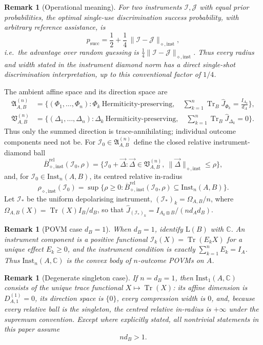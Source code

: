 \documentclass[11pt,a4paper]{article}
\newtheorem{remark}[theorem]{Remark}
\newcommand{\Lin}{\mathrm{L}}
\newcommand{\Inst}{\mathrm{Inst}}
\newcommand{\Tr}{\operatorname{Tr}}
\newcommand{\Jhat}{\widehat J}
\newcommand{\vD}{\vec{\Delta}}
\begin{document}
\begin{remark}[Operational meaning]
\label{rem:operational}
For two instruments $\mathcal I,\mathcal J$ with equal prior probabilities, the optimal single-use discrimination success probability, with arbitrary reference assistance, is
\[
p_{\mathrm{succ}}
=\frac12+\frac14\,\|\mathcal I-\mathcal J\|_{\diamond,\mathrm{inst}},
\]
i.e.\ the advantage over random guessing is $\tfrac14\|\mathcal I-\mathcal J\|_{\diamond,\mathrm{inst}}$. Thus every radius and width stated in the instrument diamond norm has a direct single-shot discrimination interpretation, up to this conventional factor of $1/4$.
\end{remark}

The ambient affine space and its direction space are
\begin{align*}
\mathfrak A_{A,B}^{(n)}
&=\Big\{(\Phi_1,\dots,\Phi_n):
\Phi_k\ \text{Hermiticity-preserving},\quad
\sum_{k=1}^n\Tr_B\Jhat_{\Phi_k}=\frac{I_{A_0}}{d_A}\Big\},\\
\mathfrak V_{A,B}^{(n)}
&=\Big\{(\Delta_1,\dots,\Delta_n):
\Delta_k\ \text{Hermiticity-preserving},\quad
\sum_{k=1}^n\Tr_B\Jhat_{\Delta_k}=0\Big\}.
\end{align*}
Thus only the summed direction is trace-annihilating; individual outcome components need not be. For $\mathcal I_0\in\mathfrak A_{A,B}^{(n)}$ define the closed relative instrument-diamond ball
\[
\overline B_{\diamond,\mathrm{inst}}^{\mathrm{rel}}(\mathcal I_0,\rho)
=\big\{\mathcal I_0+\vD:\vD\in\mathfrak V_{A,B}^{(n)},\ \|\vD\|_{\diamond,\mathrm{inst}}\le\rho\big\},
\]
and, for $\mathcal I_0\in\Inst_n(A,B)$, its centred relative in-radius
\[
\rho_{\diamond,\mathrm{inst}}(\mathcal I_0)
=\sup\Big\{\rho\ge0:
\overline B_{\diamond,\mathrm{inst}}^{\mathrm{rel}}(\mathcal I_0,\rho)
\subseteq\Inst_n(A,B)\Big\}.
\]
Let $\mathcal I_*$ be the uniform depolarising instrument, $(\mathcal I_*)_k=\Omega_{A,B}/n$, where $\Omega_{A,B}(X)=\Tr(X)I_B/d_B$, so that $\Jhat_{(\mathcal I_*)_k}=I_{A_0\otimes B}/(n d_Ad_B)$.

\begin{remark}[POVM case $d_B=1$]
\label{rem:povm}
When $d_B=1$, identify $\Lin(B)$ with $\mathbb C$. An instrument component is a positive functional $\mathcal I_k(X)=\Tr(E_kX)$ for a unique effect $E_k\ge0$, and the instrument condition is exactly $\sum_{k=1}^nE_k=I_A$. Thus $\Inst_n(A,\mathbb C)$ is the convex body of $n$-outcome POVMs on $A$.
\end{remark}

\begin{remark}[Degenerate singleton case]
\label{rem:degenerate}
If $n=d_B=1$, then $\Inst_1(A,\mathbb C)$ consists of the unique trace functional $X\mapsto\Tr(X)$: its affine dimension is $D_{A,1}^{(1)}=0$, its direction space is $\{0\}$, every compression width is $0$, and, because every relative ball is the singleton, the centred relative in-radius is $+\infty$ under the supremum convention. Except where explicitly stated, all nontrivial statements in this paper assume
\[
n d_B>1.
\]
\end{remark}
\end{document}
